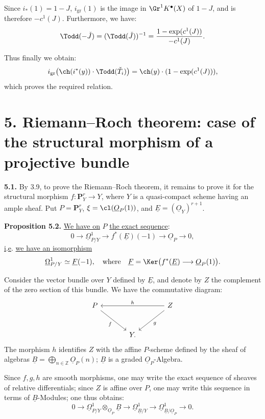 Since \(i_*(1)=1-J\), \(i_{\mathrm{gr}}(1)\) is the image in \(\Gr^1K^{\bullet}(X)\) of \(1-J\), and is therefore \(-c^1(J)\). Furthermore, we have:
\[
 \Todd(-\check J)=(\Todd(\check J))^{-1}
 =
 \frac{1-\exp(c^1(J))}{-c^1(J)}.
\]

Thus finally we obtain:
\[
 i_{\mathrm{gr}}\bigl(\ch(i^*(y))\cdot\Todd(\check T_i)\bigr)
 =
 \ch(y)\cdot(1-\exp(c^1(J))),
\]
which proves the required relation.

\section*{5. Riemann--Roch theorem: case of the structural morphism of a projective bundle}

\textbf{5.1.} By 3.9, to prove the Riemann--Roch theorem, it remains to prove it for the structural morphism \(f:\mathbf{P}^r_Y\longrightarrow Y\), where \(Y\) is a quasi-compact scheme having an ample sheaf. Put \(P=\mathbf{P}^r_Y\), \(\xi=\cl(\underline{O}_P(1))\), and \(\underline{E}=(\underline{O}_Y)^{r+1}\).

%
\textbf{Proposition 5.2.} \uline{We have on} \(P\) \uline{the exact sequence}:
\[
0\longrightarrow\underline{\Omega}^1_{P/Y}\longrightarrow f^*(\underline{E})(-1)\longrightarrow\underline{O}_P\longrightarrow0,
\]
\uline{i}.\uline{e}. \uline{we have an isomorphism}
\[
\underline{\Omega}^1_{P/Y}\simeq \underline{F}(-1),\quad\text{where}\quad \underline{F}=\Ker\bigl(f^*(\underline{E})\longrightarrow\underline{O}_P(1)\bigr).
\]

Consider the vector bundle over \(Y\) defined by \(\underline{E}\), and denote by \(Z\) the complement of the zero section of this bundle. We have the commutative diagram:
\[
\begin{tikzcd}[column sep=large,row sep=large]
P \arrow[dr,"f"'] && Z \arrow[ll,"h"'] \arrow[dl,"g"]\\
& Y. &
\end{tikzcd}
\]
The morphism \(h\) identifies \(Z\) with the affine \(P\)-scheme defined by the sheaf of algebras \(\underline{B}=\bigoplus_{n\in\mathbb Z}\underline{O}_P(n)\); \(\underline{B}\) is a graded \(\underline{O}_P\)-Algebra.

Since \(f,g,h\) are smooth morphisms, one may write the exact sequence of sheaves of relative differentials; since \(Z\) is affine over \(P\), one may write this sequence in terms of \(\underline{B}\)-Modules; one thus obtains:
\begin{equation}\tag{5.2.1}
0\longrightarrow
 \underline{\Omega}^1_{P/Y}\otimes_{\underline{O}_P}\underline{B}
\longrightarrow
 \underline{\Omega}^1_{\underline{B}/Y}
\longrightarrow
 \underline{\Omega}^1_{\underline{B}/\underline{O}_P}
\longrightarrow0 .
\end{equation}


